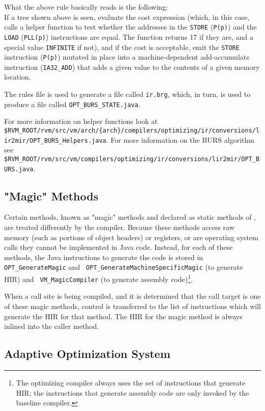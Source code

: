 What the above rule basically reads is the following:\\
If a tree shown above is seen, evaluate the cost expression (which, in this
case, calls a helper function to test whether the addresses in the
{\tt STORE} ({\tt P(p)}) and the {\tt LOAD} ({\tt PLL(p)}) instructions are
equal.  The function returns 17 if they are, and a special value
{\tt INFINITE} if not), and if the cost is acceptable, emit the {\tt STORE}
instruction ({\tt P(p)}) mutated in place into a machine-dependent
add-accumulate instruction ({\tt IA32\_ADD}) that adds a given value to the
contents of a given memory location.

The rules file is used to generate a file called {\tt ir.brg}, which, in
turn, is used to produce a file called {\tt OPT\_BURS\_STATE.java}.

For more information on helper functions look at
{\tt \$RVM\_ROOT/rvm/src/vm/arch/\{arch\}/compilers/optimizing/ir/conversions/lir2mir/OPT\_BURS\_Helpers.java}.
For more information on the BURS algorithm see
{\tt \$RVM\_ROOT/rvm/src/vm/compilers/optimizing/ir/conversions/lir2mir/OPT\_BURS.java}.

\subsection{"Magic" Methods}\label{magic}
Certain methods, known as "magic" methods and declared as static methods of 
, 
are treated differently by the compiler. Because these methods access
raw memory (such as portions of object headers) or registers, or are
operating system calls they cannot be implemented in Java\trademark
code. Instead, for each of these methods, the Java instructions to
generate the code is stored in {\tt OPT\_GenerateMagic} and {\tt
OPT\_GenerateMachineSpecificMagic} (to generate HIR) and {\tt
VM\_MagicCompiler} (to generate assembly code)\footnote{The optimizing
compiler always uses the set of instructions that generate HIR; the
instructions that generate assembly code are only invoked by the
baseline compiler.}.

When a call site
is being compiled, and it is determined that the call target is one of these
magic methods, control is transferred to the list of instructions which will
generate the HIR for that method. The HIR for the magic method is always 
inlined into the caller method.

\subsection{Adaptive Optimization System}\label{aos}


